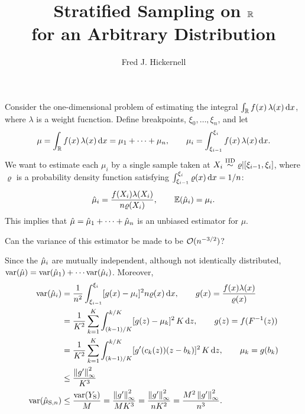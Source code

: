 \documentclass{amsart}
\begin{document}
\title{Stratified Sampling on $\reals$ \\ for an Arbitrary Distribution}
\author{Fred J. Hickernell}

\maketitle

Consider the one-dimensional problem of estimating the integral $\int_{\reals} f(x) \, \lambda(x) \, \dif x$, where $\lambda$ is a weight fucnction.  Define breakpoints, $\xi_0, \ldots, \xi_n$, and let 
\begin{equation*}
    \mu = \int_{\reals} f(x) \, \lambda(x) \, \dif x = \mu_1 + \cdots + \mu_n, \qquad \mu_i = \int_{\xi_{i-1}}^{\xi_i} f(x) \, \lambda(x) \, \dif x.
\end{equation*}
We want to estimate each $\mu_i$ by a single sample taken at $X_i \IIDsim \varrho|[\xi_{i-1},\xi_i]$, where $\varrho$ is a probability density function satisfying $\int_{\xi_{i-1}}^{\xi_i} \varrho(x) \, \dif x =  1/n$:
\begin{equation*}
    \hmu_i = \frac{f(X_i) \lambda(X_i)}{n\varrho(X_i)}, \qquad \bbE(\hmu_i) = \mu_i.
\end{equation*}
This implies that $\hmu = \hmu_1 + \cdots + \hmu_n$ is an unbiased estimator for $\mu$.

Can the variance of this estimator be made to be $\Order(n^{-3/2})$?

Since the $\hmu_i$ are mutually independent, although not identically distributed, $\var(\hmu) = \var(\hmu_1) + \cdots \var(\hmu_i)$.  Moreover,
\begin{align*}
\var(\hmu_i) & = \frac{1}{n^2} \int_{\xi_{i-1}}^{\xi_i} [g(x) - \mu_i]^2 n\varrho(x) \, \dif x, \qquad g(x) =  \frac{f(x) \lambda(x)}{\varrho(x)} \\
& = \frac{1}{K^2}\sum_{k=1}^K \int_{(k-1)/K}^{k/K} [g(z) - \mu_k]^2 \, K \, \dif z, \qquad g(z) = f(F^{-1}(z)) \\
& = \frac{1}{K^2}\sum_{k=1}^K \int_{(k-1)/K}^{k/K} [g'(c_{k}(z))(z-b_k)]^2 \, K \,\dif z, \qquad \mu_k=g(b_k) \\
& \le \frac{\norm[\infty]{g'}^2}{K^3} \\
\var(\hmu_{\text{S},n})& \le \frac{\var(Y_{\text{S}})}{M} = \frac{\norm[\infty]{g'}^2}{MK^3} =\frac{\norm[\infty]{g'}^2}{nK^2} = \frac{M^2\norm[\infty]{g'}^2}{n^3} .
\end{align*}
\end{document}
